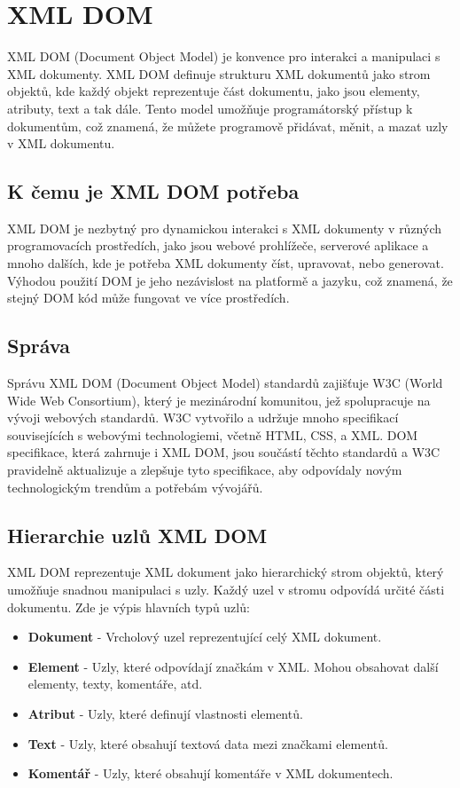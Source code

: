 \chapter{XML DOM}
\label{cha:XML_DOM}
XML DOM (Document Object Model) je konvence pro interakci a manipulaci s XML dokumenty. XML DOM definuje strukturu XML dokumentů jako strom objektů, kde každý objekt reprezentuje část dokumentu, jako jsou elementy, atributy, text a tak dále. Tento model umožňuje programátorský přístup k dokumentům, což znamená, že můžete programově přidávat, měnit, a mazat uzly v XML dokumentu.

\section{K čemu je XML DOM potřeba}
\label{sec:use_xml_dom}

XML DOM je nezbytný pro dynamickou interakci s XML dokumenty v různých programovacích prostředích, jako jsou webové prohlížeče, serverové aplikace a mnoho dalších, kde je potřeba XML dokumenty číst, upravovat, nebo generovat. Výhodou použití DOM je jeho nezávislost na platformě a jazyku, což znamená, že stejný DOM kód může fungovat ve více prostředích.

\section{Správa}
\label{sec:Sprava}

Správu XML DOM (Document Object Model) standardů zajišťuje W3C (World Wide Web Consortium), který je mezinárodní komunitou, jež spolupracuje na vývoji webových standardů. W3C vytvořilo a udržuje mnoho specifikací souvisejících s webovými technologiemi, včetně HTML, CSS, a XML. DOM specifikace, která zahrnuje i XML DOM, jsou součástí těchto standardů a W3C pravidelně aktualizuje a zlepšuje tyto specifikace, aby odpovídaly novým technologickým trendům a potřebám vývojářů.

\section{Hierarchie uzlů XML DOM}
\label{sec:Hierarchie}

XML DOM reprezentuje XML dokument jako hierarchický strom objektů, který umožňuje snadnou manipulaci s uzly. Každý uzel v stromu odpovídá určité části dokumentu. Zde je výpis hlavních typů uzlů:

\begin{itemize}
  \item \textbf{Dokument} - Vrcholový uzel reprezentující celý XML dokument.
  \item \textbf{Element} - Uzly, které odpovídají značkám v XML. Mohou obsahovat další elementy, texty, komentáře, atd.
  \item \textbf{Atribut} - Uzly, které definují vlastnosti elementů.
  \item \textbf{Text} - Uzly, které obsahují textová data mezi značkami elementů.
  \item \textbf{Komentář} - Uzly, které obsahují komentáře v XML dokumentech.
\end{itemize}

